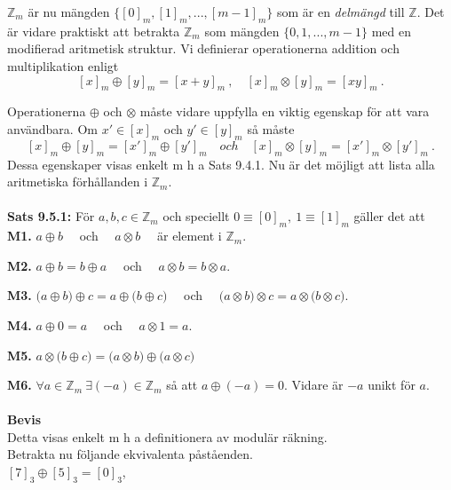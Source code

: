 \documentclass{article}
\begin{document}
$\mathbb{Z}_m$ är nu mängden $\{[0]_m,[1]_m,...,[m-1]_m\}$ som  är en \textit{delmängd} till $\mathbb{Z}$. Det är vidare praktiskt att betrakta $\mathbb{Z}_m$ som mängden $\{0,1,...,m-1\}$ med en modifierad aritmetisk struktur. Vi definierar operationerna addition och multiplikation enligt
$$
[x]_m\oplus[y]_m = [x+y]_m \ , \quad [x]_m\otimes[y]_m=[xy]_m \ .
$$

Operationerna $\oplus$ och $\otimes$ måste vidare uppfylla en viktig egenskap för att vara användbara. Om $x'\in[x]_m$ och $y'\in[y]_m$ så måste
$$
[x]_m\oplus[y]_m=[x']_m\oplus[y']_m \quad och \quad [x]_m\otimes[y]_m=[x']_m\otimes[y']_m \ .
$$
Dessa egenskaper visas enkelt m h a Sats 9.4.1. Nu är det möjligt att lista alla aritmetiska förhållanden i $\mathbb{Z}_m$. \\ \\
\textbf{Sats 9.5.1:} För $a,b,c\in\mathbb{Z}_m$ och speciellt $0\equiv[0]_m, \ 1\equiv[1]_m$ gäller det att\\

\textbf{M1.}\hspace{0.5 cm} $a\oplus b\quad$ och $\quad a\otimes b\quad$ är element i $\mathbb{Z}_m$.

\textbf{M2.}\hspace{0.5 cm} $a\oplus b=b\oplus a\quad$ och $\quad a\otimes b=b\otimes a$.

\textbf{M3.}\hspace{0.5 cm} $\big(a\oplus b\big)\oplus c=a\oplus\big(b\oplus c\big)\quad$ och $\quad\big(a\otimes b\big)\otimes c=a\otimes\big(b\otimes c\big)$.

\textbf{M4.}\hspace{0.5 cm} $a\oplus0=a\quad$ och $\quad a\otimes 1=a$.

\textbf{M5.}\hspace{0.5 cm} $a\otimes\big(b\oplus c\big)=\big(a\otimes b\big)\oplus \big(a\otimes c\big)$

\textbf{M6.}\hspace{0.5 cm} $\forall a\in\mathbb{Z}_m \ \exists (-a)\in\mathbb{Z}_m$ så att $a\oplus(-a)=0$. Vidare är $-a$ unikt för $a$.\\ \\
\textbf{Bevis}\\
Detta visas enkelt m h a definitionera av modulär räkning.\\

Betrakta nu följande ekvivalenta påståenden.\\

$[7]_3\oplus[5]_3=[0]_3$,
\end{document}
